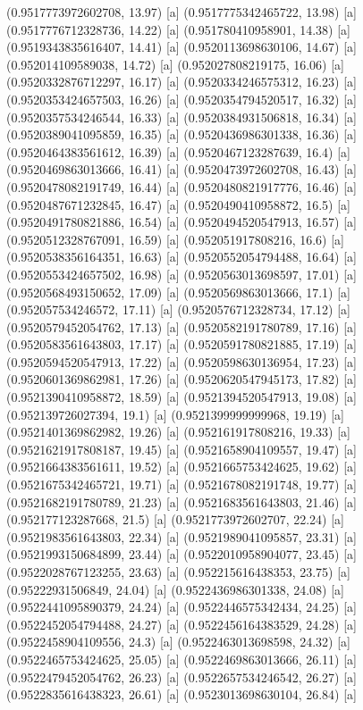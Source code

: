 {{{(0.9517773972602708, 13.97) [a] 
(0.9517775342465722, 13.98) [a] 
(0.9517776712328736, 14.22) [a] 
(0.951780410958901, 14.38) [a] 
(0.9519343835616407, 14.41) [a] 
(0.9520113698630106, 14.67) [a] 
(0.952014109589038, 14.72) [a] 
(0.952027808219175, 16.06) [a] 
(0.9520332876712297, 16.17) [a] 
(0.9520334246575312, 16.23) [a] 
(0.9520353424657503, 16.26) [a] 
(0.9520354794520517, 16.32) [a] 
(0.9520357534246544, 16.33) [a] 
(0.9520384931506818, 16.34) [a] 
(0.9520389041095859, 16.35) [a] 
(0.9520436986301338, 16.36) [a] 
(0.9520464383561612, 16.39) [a] 
(0.9520467123287639, 16.4) [a] 
(0.9520469863013666, 16.41) [a] 
(0.9520473972602708, 16.43) [a] 
(0.9520478082191749, 16.44) [a] 
(0.9520480821917776, 16.46) [a] 
(0.9520487671232845, 16.47) [a] 
(0.9520490410958872, 16.5) [a] 
(0.9520491780821886, 16.54) [a] 
(0.9520494520547913, 16.57) [a] 
(0.9520512328767091, 16.59) [a] 
(0.952051917808216, 16.6) [a] 
(0.9520538356164351, 16.63) [a] 
(0.9520552054794488, 16.64) [a] 
(0.9520553424657502, 16.98) [a] 
(0.9520563013698597, 17.01) [a] 
(0.9520568493150652, 17.09) [a] 
(0.9520569863013666, 17.1) [a] 
(0.952057534246572, 17.11) [a] 
(0.9520576712328734, 17.12) [a] 
(0.9520579452054762, 17.13) [a] 
(0.9520582191780789, 17.16) [a] 
(0.9520583561643803, 17.17) [a] 
(0.9520591780821885, 17.19) [a] 
(0.9520594520547913, 17.22) [a] 
(0.9520598630136954, 17.23) [a] 
(0.9520601369862981, 17.26) [a] 
(0.9520620547945173, 17.82) [a] 
(0.9521390410958872, 18.59) [a] 
(0.9521394520547913, 19.08) [a] 
(0.952139726027394, 19.1) [a] 
(0.9521399999999968, 19.19) [a] 
(0.9521401369862982, 19.26) [a] 
(0.952161917808216, 19.33) [a] 
(0.9521621917808187, 19.45) [a] 
(0.9521658904109557, 19.47) [a] 
(0.9521664383561611, 19.52) [a] 
(0.9521665753424625, 19.62) [a] 
(0.9521675342465721, 19.71) [a] 
(0.9521678082191748, 19.77) [a] 
(0.9521682191780789, 21.23) [a] 
(0.9521683561643803, 21.46) [a] 
(0.952177123287668, 21.5) [a] 
(0.9521773972602707, 22.24) [a] 
(0.9521983561643803, 22.34) [a] 
(0.9521989041095857, 23.31) [a] 
(0.9521993150684899, 23.44) [a] 
(0.9522010958904077, 23.45) [a] 
(0.9522028767123255, 23.63) [a] 
(0.952215616438353, 23.75) [a] 
(0.95222931506849, 24.04) [a] 
(0.9522436986301338, 24.08) [a] 
(0.9522441095890379, 24.24) [a] 
(0.9522446575342434, 24.25) [a] 
(0.9522452054794488, 24.27) [a] 
(0.9522456164383529, 24.28) [a] 
(0.9522458904109556, 24.3) [a] 
(0.9522463013698598, 24.32) [a] 
(0.9522465753424625, 25.05) [a] 
(0.9522469863013666, 26.11) [a] 
(0.9522479452054762, 26.23) [a] 
(0.9522657534246542, 26.27) [a] 
(0.9522835616438323, 26.61) [a] 
(0.9523013698630104, 26.84) [a] 
}}}
